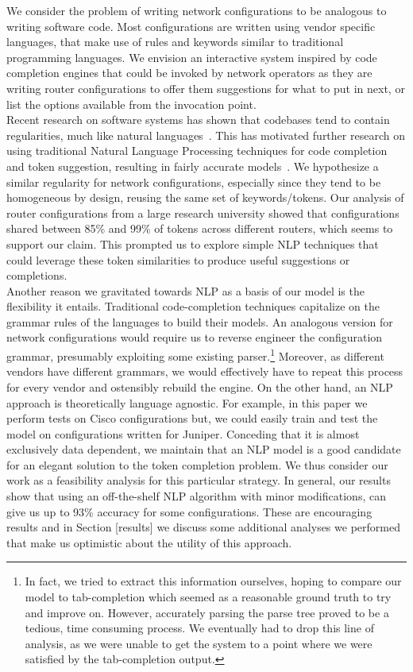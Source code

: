 We consider the problem of writing network configurations to be analogous to writing software code. Most configurations are written using vendor specific languages, that make use of rules and keywords similar to traditional programming languages. We envision an interactive system inspired by code completion engines that could be invoked by network operators as they are writing router configurations to offer them suggestions for what to put in next, or list the options available from the invocation point.\\

Recent research on software systems has shown that codebases tend to contain regularities, much like natural languages~\cite{naturalness}. This has motivated further research on using traditional Natural Language Processing techniques for code completion and token suggestion, resulting in fairly accurate models~\cite{naturalness, raychev}. We hypothesize a similar regularity for network configurations, especially since they tend to be homogeneous by design, reusing the same set of keywords/tokens. Our analysis of router configurations from a large research university showed that configurations shared between 85\% and 99\% of tokens across different routers, which seems to support our claim. This prompted us to explore simple NLP techniques that could leverage these token similarities to produce useful suggestions or completions.\\

Another reason we gravitated towards NLP as a basis of our model is the flexibility it entails. Traditional code-completion techniques capitalize on the grammar rules of the languages to build their models. An analogous version for network configurations would require us to reverse engineer the configuration grammar, presumably exploiting some existing parser.\footnote{In fact, we tried to extract this information ourselves, hoping to compare our model to tab-completion which seemed as a reasonable ground truth to try and improve on. However, accurately parsing the parse tree proved to be a tedious, time consuming process. We eventually had to drop this line of analysis, as we were unable to get the system to a point where we were satisfied by the tab-completion output.}
Moreover, as different vendors have different grammars, we would effectively have to repeat this process for every vendor and ostensibly rebuild the engine. On the other hand, an NLP approach is theoretically language agnostic. For example, in this paper we perform tests on Cisco configurations but, we could easily train and test the model on configurations written for Juniper. Conceding that it is almost exclusively data dependent, we maintain that an NLP model is a good candidate for an elegant solution to the token completion problem. We thus consider our work as a feasibility analysis for this particular strategy. In general, our results show that using an off-the-shelf NLP algorithm with minor modifications, can give us up to 93\% accuracy for some configurations. These are encouraging results and in Section [results] we discuss some additional analyses we performed that make us optimistic about the utility of this approach.\\

